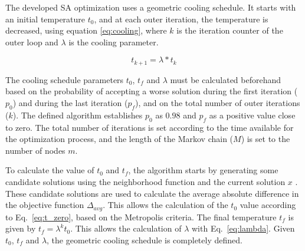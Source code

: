 
The developed SA optimization uses a geometric cooling schedule. It starts with an initial temperature $t_0$, and at each outer iteration, the temperature is decreased, using equation \ref{eq:cooling}, where $k$ is the iteration counter of the outer loop and $\lambda$ is the cooling parameter. 

\begin{equation}
    \label{eq:cooling}
     t_{k+1} = \lambda * t_{k}
\end{equation}

The cooling schedule parameters $t_0$, $t_f$ and $\lambda$ must be calculated beforehand based on the probability of accepting a worse solution during the first iteration ($p_0$) and during the last iteration ($p_f$), and on the total number of outer iterations ($k$). The defined algorithm establishes $p_0$ as $0.98$ and $p_f$ as a positive value close to zero. The total number of iterations is set according to the time available for the optimization process, and the length of the Markov chain ($M$) is set to the number of nodes $m$.


To calculate the value of $t_0$ and $t_f$, the algorithm starts by generating some candidate solutions using the neighborhood function and the current solution $x$ \cite{SA_methods}. These candidate solutions are used to calculate the average absolute difference in the objective function $\Delta_{avg}$. This allows the calculation of the  $t_0$ value according to Eq.~\ref{eq:t_zero}, based on the Metropolis criteria. The final temperature $t_f$ is given by $t_f = \lambda^{k}t_0$. This allows the calculation of $\lambda$ with Eq.~\ref{eq:lambda}. Given $t_0$, $t_f$ and $\lambda$, the geometric cooling schedule is completely defined.

